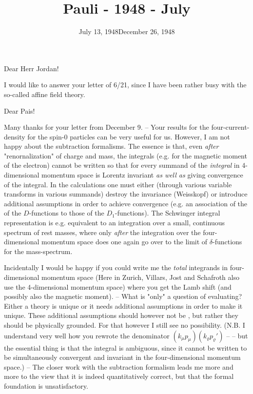 \documentclass{article}
\title{Pauli - 1948 - July}
\begin{document}
\date{July 13, 1948}

Dear Herr Jordan!

I would like to answer your letter of 6/21, since I have been rather busy with the so-called affine field theory.

\date{December 26, 1948}

Dear Pais!

Many thanks for your letter from December 9. -- Your results for the four-current-density for the spin-0 particles can be very useful for us. However, I am not happy about the subtraction formalisms. The essence is that, even \textit{after} "renornalization" of charge and mass, the integrals (e.g. for the magnetic moment of the electron) cannot be written so that for every summand of the \textit{integral} in 4-dimensional momentum space is Lorentz invariant \textit{as well as} giving convergence of the integral. In the calculations one must either (through various variable transforms in various summands) destroy the invariance (Weisskopf) or introduce additional assumptions in order to achieve convergence (e.g. an association of the  of the $D$-functions to those of the $D_1$-functions). The Schwinger integral representation is e.g. equivalent to an integration over a small, continuous spectrum of rest masses, where only \textit{after} the integration over the four-dimensional momentum space does one again go over to the limit of $\delta$-functions for the mass-spectrum. 

Incidentally I would be happy if you could write me the \textit{total} integrands in four-dimensional momentum space (Here in Zurich, Villars, Jost and Schafroth also use the 4-dimensional momentum space) where you get the Lamb shift (and possibly also the magnetic moment). -- What is "only" a question of evaluating? Either a theory is unique or it needs additional assumptions in order to make it unique. These additional assumptions should however not be , but rather they should be physically grounded. For that however I still see no possibility. (N.B. I understand very well how you rewrote the denominator $(k_\mu p_\mu)(k_\varrho p_\varrho')$ --  -- but the essential thing is that the integral is ambiguous, since it cannot be written to be simultaneously convergent and invariant in the four-dimensional momentum space.) -- The closer work with the subtraction formalism leads me more and more to the view that it is indeed quantitatively correct, but that the formal foundation is unsatisfactory.
\end{document}
